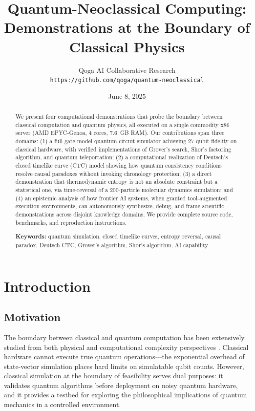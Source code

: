 \documentclass[12pt,a4paper]{article}
\title{\Large\textbf{Quantum-Neoclassical Computing:}\\[4pt]
       \large Demonstrations at the Boundary of Classical Physics}
\author{Qoga AI Collaborative Research\\
        \texttt{https://github.com/qoga/quantum-neoclassical}}
\date{June 8, 2025}
\begin{document}
\maketitle

\begin{abstract}
We present four computational demonstrations that probe the boundary between classical computation and quantum physics, all executed on a single commodity x86 server (AMD EPYC-Genoa, 4 cores, 7.6~GB RAM). Our contributions span three domains: (1) a full gate-model quantum circuit simulator achieving 27-qubit fidelity on classical hardware, with verified implementations of Grover's search, Shor's factoring algorithm, and quantum teleportation; (2) a computational realization of Deutsch's closed timelike curve (CTC) model showing how quantum consistency conditions resolve causal paradoxes without invoking chronology protection; (3) a direct demonstration that thermodynamic entropy is not an absolute constraint but a statistical one, via time-reversal of a 200-particle molecular dynamics simulation; and (4) an epistemic analysis of how frontier AI systems, when granted tool-augmented execution environments, can autonomously synthesize, debug, and frame scientific demonstrations across disjoint knowledge domains. We provide complete source code, benchmarks, and reproduction instructions.

\textbf{Keywords:} quantum simulation, closed timelike curves, entropy reversal, causal paradox, Deutsch CTC, Grover's algorithm, Shor's algorithm, AI capability
\end{abstract}


\section{Introduction}

\subsection{Motivation}

The boundary between classical and quantum computation has been extensively studied from both physical and computational complexity perspectives \cite{feynman1982}. Classical hardware cannot execute true quantum operations—the exponential overhead of state-vector simulation places hard limits on simulatable qubit counts. However, classical simulation at the boundary of feasibility serves dual purposes: it validates quantum algorithms before deployment on noisy quantum hardware, and it provides a testbed for exploring the philosophical implications of quantum mechanics in a controlled environment.
\end{document}
